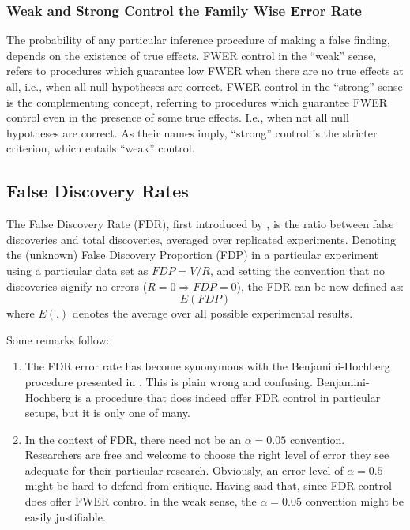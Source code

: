 \documentclass[review,12pt]{article}
\begin{document}
\subsubsection{Weak and Strong Control the Family Wise Error Rate}
The probability of any particular inference procedure of making a false finding, depends on the existence of true effects. FWER control in the ``weak'' sense, refers to procedures which guarantee low FWER when there are no true effects at all, i.e., when all null hypotheses are correct. 
FWER control in the ``strong'' sense is the complementing concept, referring to procedures which guarantee FWER control even in the presence of some true effects. I.e., when not all null hypotheses are correct. 
As their names imply, ``strong'' control is the stricter criterion, which entails ``weak'' control.




\subsection{\label{sub:fdr}False Discovery Rates}

The False Discovery Rate (FDR), first introduced by \citet{benjamini_controlling_1995}, is the ratio between false discoveries and total discoveries, averaged over replicated experiments. 
Denoting the (unknown) False Discovery Proportion (FDP) in a particular experiment using a particular data set as $ FDP=V/R $, and setting the convention that no discoveries signify no errors ($R=0 \Rightarrow FDP=0$), the FDR can be now defined as:
$$E \left( FDP \right)$$ 
where $E(.)$ denotes the average over all possible experimental results.


Some remarks follow:
\begin{enumerate}
\item The FDR error rate has become synonymous with the Benjamini-Hochberg procedure presented in \citep{benjamini_controlling_1995} . This is plain wrong and confusing. Benjamini-Hochberg is a procedure that does indeed offer FDR control in particular setups, but it is only one of many.
\item In the context of FDR, there need not be an $\alpha=0.05$ convention. Researchers are free and welcome to choose the right level of error they see adequate for their particular research. Obviously, an error level of $\alpha=0.5$ might be hard to defend from critique. Having said that, since FDR control does offer FWER control in the weak sense, the $\alpha=0.05$ convention might be easily justifiable.
\end{enumerate}
\end{document}
